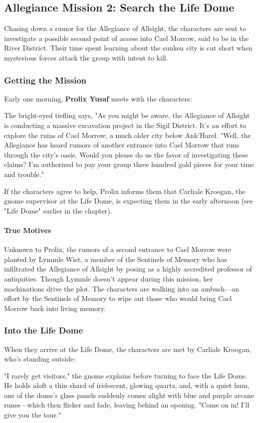 \documentclass[10pt,a4,twoside,twocolumn,openany,nodeprecatedcode]{dndbook}
\begin{document}
\subsection{Allegiance Mission 2: Search the Life Dome}
Chasing down a rumor for the Allegiance of Allsight, the characters are sent to investigate a possible second point of access into Cael Morrow, said to be in the River District. Their time spent learning about the sunken city is cut short when mysterious forces attack the group with intent to kill.
\subsubsection{Getting the Mission}
Early one morning, \textbf{Prolix Yusaf} meets with the characters:
\begin{DndReadAloud}{}
The bright-eyed tiefling says, "As you might be aware, the Allegiance of Allsight is conducting a massive excavation project in the Sigil District. It's an effort to explore the ruins of Cael Morrow, a much older city below Ank'Harel.
"Well, the Allegiance has heard rumors of another entrance into Cael Morrow that runs through the city's oasis. Would you please do us the favor of investigating these claims? I'm authorized to pay your group three hundred gold pieces for your time and trouble."
\end{DndReadAloud}

If the characters agree to help, Prolix informs them that Carliale Kroogan, the gnome supervisor at the Life Dome, is expecting them in the early afternoon (see "Life Dome" earlier in the chapter).
\paragraph{True Motives}
Unknown to Prolix, the rumors of a second entrance to Cael Morrow were planted by Lymmle Wist, a member of the Sentinels of Memory who has infiltrated the Allegiance of Allsight by posing as a highly accredited professor of antiquities. Though Lymmle doesn't appear during this mission, her machinations drive the plot. The characters are walking into an ambush—an effort by the Sentinels of Memory to wipe out those who would bring Cael Morrow back into living memory.
\subsubsection{Into the Life Dome}
When they arrive at the Life Dome, the characters are met by Carliale Kroogan, who's standing outside:
\begin{DndReadAloud}{}
"I rarely get visitors," the gnome explains before turning to face the Life Dome. He holds aloft a thin shard of iridescent, glowing quartz, and, with a quiet hum, one of the dome's glass panels suddenly comes alight with blue and purple arcane runes—which then flicker and fade, leaving behind an opening. "Come on in! I'll give you the tour."
\end{DndReadAloud}
\end{document}
